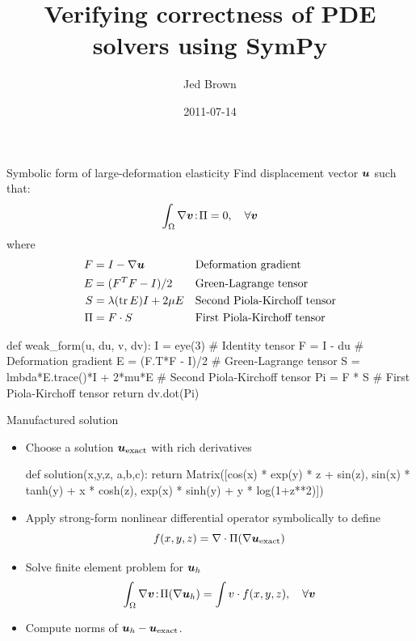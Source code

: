 \documentclass{beamer}
\title{Verifying correctness of PDE solvers using SymPy}
\author{Jed Brown}
\institute[ANL]
{
  {Argonne National Laboratory} / {ETH Z\"urich}
}
\date{2011-07-14}
\begin{document}
\lstset{language=C}
\normalem

\begin{frame}
\titlepage
\end{frame}

\begin{frame}[fragile,shrink=5]{Symbolic form of large-deformation elasticity}
  Find displacement vector $\bm u$ such that:
  \begin{equation*}
    \int_\Omega \nabla \bm v \!:\! \Pi = 0,\quad \forall \bm v
  \end{equation*}
  where
  \begin{align*}
    F   & = I - \nabla \bm u                &  & \text{Deformation gradient}  \\
    E   & = (F^T F - I)/2                 &  & \text{Green-Lagrange tensor} \\
    S   & = \lambda (\operatorname{tr} E) I + 2\mu E &  & \text{Second Piola-Kirchoff tensor} \\
    \Pi & = F \cdot S                     &  & \text{First Piola-Kirchoff tensor}
  \end{align*}
\begin{pythoncode}
  def weak_form(u, du, v, dv):
    I = eye(3)                      # Identity tensor
    F = I - du                      # Deformation gradient
    E = (F.T*F - I)/2               # Green-Lagrange tensor
    S = lmbda*E.trace()*I + 2*mu*E  # Second Piola-Kirchoff tensor
    Pi = F * S                      # First Piola-Kirchoff tensor
    return dv.dot(Pi)
\end{pythoncode}
\end{frame}

\begin{frame}[fragile]{Manufactured solution}
  \begin{itemize}
  \item Choose a solution $\bm u_{\text{exact}}$ with rich derivatives
  \begin{pythoncode}
  def solution(x,y,z, a,b,c):
    return Matrix([cos(x) * exp(y) * z + sin(z),
                   sin(x) * tanh(y) + x * cosh(z),
                   exp(x) * sinh(y) + y * log(1+z**2)])
  \end{pythoncode}
  \item Apply strong-form nonlinear differential operator symbolically
    to define
    \[ f(x,y,z) = \nabla\cdot \Pi(\nabla \bm u_{\text{exact}}) \]
  \item Solve finite element problem for $\bm u_h$
    \begin{equation*}
      \int_\Omega \nabla \bm v \!:\! \Pi(\nabla \bm u_h) = \int v\cdot f(x,y,z),\quad \forall \bm v
    \end{equation*}
  \item Compute norms of $\bm u_h - \bm u_{\text{exact}}$.
  \end{itemize}
\end{frame}
\end{document}
